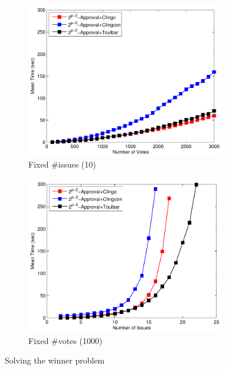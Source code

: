{
	\begin{figure}
		\centering
    \begin{subfigure}[b]{0.45\textwidth}
			\centering
			\includegraphics[width=0.95\textwidth]{figs/LPTrees/win/expAppFISCICP.pdf}
			\caption{Fixed \#issues (10)}
		\end{subfigure}
    \begin{subfigure}[b]{0.45\textwidth}
			\centering
			\includegraphics[width=0.95\textwidth]{figs/LPTrees/win/expAppFVSCICP.pdf}
			\caption{Fixed \#votes (1000)}
		\end{subfigure}

		\caption{Solving the winner problem}
	\end{figure}
}

